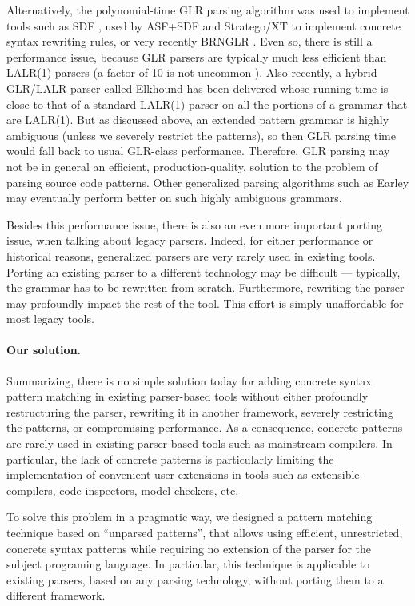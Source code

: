 Alternatively, the polynomial-time GLR parsing algorithm \cite{glr}
was used to implement tools such as SDF \cite{sdf}, used by ASF+SDF
\cite{asf+sdf} and Stratego/XT \cite{metaprog} to implement concrete
syntax rewriting rules, or very recently BRNGLR \cite{brnglr}. Even
so, there is still a performance issue, because GLR parsers are
typically much less efficient than LALR(1) parsers (a factor of 10 is
not uncommon \cite{elkhound}). Also recently, a hybrid GLR/LALR parser
called Elkhound \cite{elkhound} has been delivered whose running time
is close to that of a standard LALR(1) parser on all the portions of a
grammar that are LALR(1). But as discussed above, an extended pattern
grammar is highly ambiguous (unless we severely restrict the
patterns), so then GLR parsing time would fall back to usual GLR-class
performance. Therefore, GLR parsing may not be in general an
efficient, production-quality, solution to the problem of parsing
source code patterns. Other generalized parsing algorithms such as
Earley \cite{earley} may eventually perform better on such highly
ambiguous grammars.

Besides this performance issue, there is also an even more important
porting issue, when talking about legacy parsers. Indeed, for either
performance or historical reasons, generalized parsers are very rarely
used in existing tools. Porting an existing parser to a different
technology may be difficult --- typically, the grammar has to be
rewritten from scratch. Furthermore, rewriting the parser may
profoundly impact the rest of the tool. This effort is simply
unaffordable for most legacy tools.

\paragraph{Our solution.}
Summarizing, there is no simple solution today for adding concrete
syntax pattern matching in existing parser-based tools without either
profoundly restructuring the parser, rewriting it in another
framework, severely restricting the patterns, or compromising
performance. As a consequence, concrete patterns are rarely used in
existing parser-based tools such as mainstream compilers. In
particular, the lack of concrete patterns is particularly limiting
the implementation of convenient user extensions in tools such as
extensible compilers, code inspectors, model checkers, etc.

To solve this problem in a pragmatic way, we designed a pattern
matching technique based on ``unparsed patterns'', that allows using
efficient, unrestricted, concrete syntax patterns while requiring no
extension of the parser for the subject programing language. In
particular, this technique is applicable to existing parsers, based on
any parsing technology, without porting them to a different framework.


